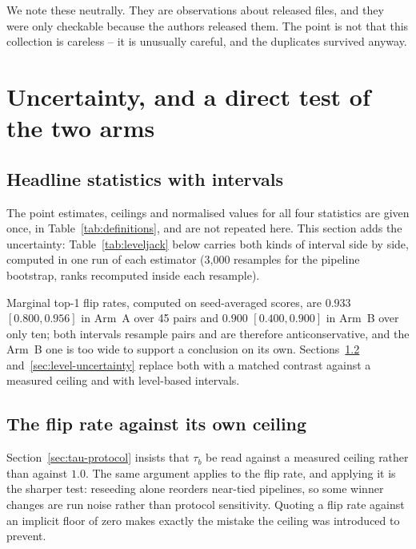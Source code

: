 \documentclass[11pt,a4paper]{article}
\begin{document}
We note these neutrally. They are observations about released files, and they were only
checkable because the authors released them. The point is not that this collection is
careless -- it is unusually careful, and the duplicates survived anyway.

\section{Uncertainty, and a direct test of the two arms}

\subsection{Headline statistics with intervals}

The point estimates, ceilings and normalised values for all four statistics are given once,
in Table~\ref{tab:definitions}, and are not repeated here. This section adds the
uncertainty: Table~\ref{tab:leveljack} below carries both kinds of interval side by side,
computed in one run of each estimator (3{,}000 resamples for the pipeline bootstrap, ranks
recomputed inside each resample).

Marginal top-1 flip rates, computed on seed-averaged scores, are $0.933$ $[0.800, 0.956]$
in Arm~A over 45 pairs and $0.900$ $[0.400, 0.900]$ in Arm~B over only ten; both intervals
resample pairs and are therefore anticonservative, and the Arm~B one is too wide to support
a conclusion on its own. Sections~\ref{sec:flip-ceiling}
and~\ref{sec:level-uncertainty} replace both with a matched contrast against a measured
ceiling and with level-based intervals.

\subsection{The flip rate against its own ceiling}
\label{sec:flip-ceiling}

Section~\ref{sec:tau-protocol} insists that $\tau_b$ be read against a measured ceiling
rather than against $1.0$. The same argument applies to the flip rate, and applying it is
the sharper test: reseeding alone reorders near-tied pipelines, so some winner changes are
run noise rather than protocol sensitivity. Quoting a flip rate against an implicit floor
of zero makes exactly the mistake the ceiling was introduced to prevent.
\end{document}

